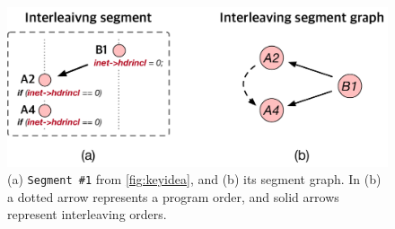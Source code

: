 \begin{figure}[t]
  \centering
  \includegraphics[width=0.9\linewidth]{fig/interleavingsegmentgraph.pdf}
  \caption{(a) \texttt{Segment \#1} from \autoref{fig:keyidea}, and
    (b) its segment graph. In (b) a dotted arrow represents a program
    order, and solid arrows represent interleaving orders.}
  \label{fig:interleavingsegmentgraph}
\end{figure}

%


%



